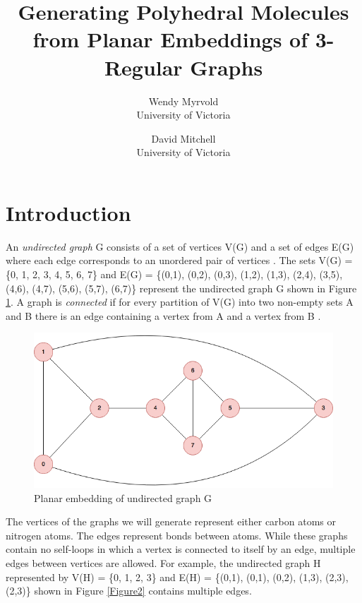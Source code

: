 \documentclass[12pt]{article}
\begin{document}
\title{ Generating Polyhedral Molecules from Planar Embeddings of 3-Regular Graphs}
\author{Wendy Myrvold \\ University of Victoria 
\and David Mitchell  \\ University of Victoria 
}
\maketitle
\section{Introduction}

An \textit{undirected graph} G consists of a set of vertices V(G) and a set of edges E(G) where each edge corresponds to an unordered pair of vertices \cite{BM}. The sets V(G) = \{0, 1, 2, 3, 4, 5, 6, 7\} and E(G) = \{(0,1), (0,2), (0,3), (1,2), (1,3), (2,4), (3,5),  (4,6), (4,7), (5,6), (5,7), (6,7)\} represent the undirected graph G shown in Figure \ref{Figure1}. A graph is \textit{connected} if for every partition of V(G) into two non-empty sets A and B there is an edge containing a vertex from A and a vertex from B \cite{BM}. 

\begin{figure}[H]
    \includegraphics[scale=.4, center]{Figure1}
    \caption{Planar embedding of undirected graph G}
    \label{Figure1}
\end{figure}

The vertices of the graphs we will generate represent either carbon atoms or nitrogen atoms. The edges represent bonds between atoms. While these graphs contain no self-loops in which a vertex is connected to itself by an edge, multiple edges between vertices are allowed. For example, the undirected graph H represented by V(H) = \{0, 1, 2, 3\} and E(H) = \{(0,1), (0,1), (0,2), (1,3), (2,3), (2,3)\} shown in Figure \ref{Figure2} contains multiple edges.
\end{document}
